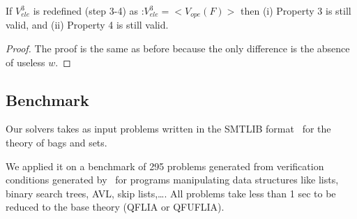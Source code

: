 \begin{myprop}
If $V^3_{ele}$ is redefined (step 3-4) as :$V^3_{ele} = <V_{ope}(F)>$ then
(i) Property 3 is still valid, and
(ii) Property 4 is  still valid.
\end{myprop}

\begin{proof}
The proof is the same as before because the only difference is the absence of useless $w$.
\end{proof}



\subsection{Benchmark}
\label{ssec:bench}

Our solvers takes as input problems written in the SMTLIB format~\cite{SMTLIB10} for the theory of bags and sets.

We applied it on a benchmark of 295 problems generated from verification conditions generated by~\cite{enea2014compositional}
for programs manipulating data structures
like lists, binary search trees, AVL, skip lists,\ldots.
All problems take less than 1 sec to be reduced to the base theory (QFLIA or QFUFLIA).
%



